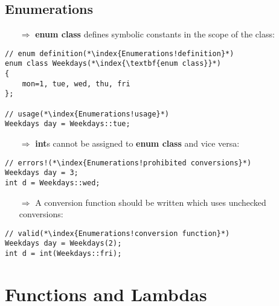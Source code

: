 \documentclass[10pt]{book}
\begin{document}
\section{Enumerations}
\begin{enumerate}
\item[$\Rightarrow$] \textbf{enum class} defines symbolic constants in the scope of the class:
\end{enumerate}
\begin{lstlisting}
// enum definition(*\index{Enumerations!definition}*)
enum class Weekdays(*\index{\textbf{enum class}}*)
{
    mon=1, tue, wed, thu, fri
};

// usage(*\index{Enumerations!usage}*)
Weekdays day = Weekdays::tue;
\end{lstlisting}
\begin{enumerate}
\item[$\Rightarrow$] \textbf{int}s cannot be assigned to \textbf{enum class} and vice versa:
\end{enumerate}
\begin{lstlisting}
// errors!(*\index{Enumerations!prohibited conversions}*)
Weekdays day = 3;
int d = Weekdays::wed;
\end{lstlisting}
\begin{enumerate}
\item[$\Rightarrow$] A conversion function should be written which uses unchecked conversions:
\end{enumerate}
\begin{lstlisting}
// valid(*\index{Enumerations!conversion function}*)
Weekdays day = Weekdays(2);
int d = int(Weekdays::fri);
\end{lstlisting}
%
%
\chapter{Functions and Lambdas}
%
%
\end{document}
